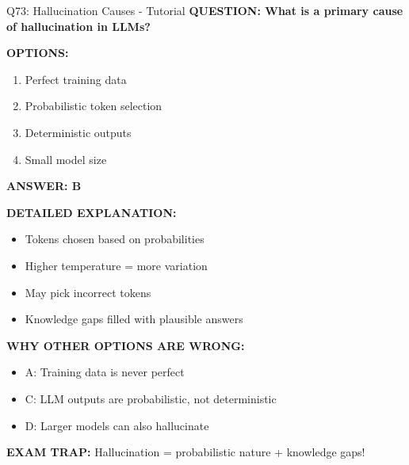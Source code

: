 \documentclass[8pt]{beamer}
\begin{document}
	\begin{frame}{Q73: Hallucination Causes - Tutorial}
		\fontsize{6.5}{7.5}\selectfont
		\textbf{QUESTION: What is a primary cause of hallucination in LLMs?}
		
		\vspace{0.1cm}
		\textbf{OPTIONS:}
		\begin{enumerate}
			\item Perfect training data
			\item Probabilistic token selection
			\item Deterministic outputs
			\item Small model size
		\end{enumerate}
		
		\vspace{0.1cm}
		\textcolor{myblue}{\textbf{ANSWER: B}}
		
		\vspace{0.1cm}
		\textbf{DETAILED EXPLANATION:}
		\begin{itemize}
			\item Tokens chosen based on probabilities
			\item Higher temperature = more variation
			\item May pick incorrect tokens
			\item Knowledge gaps filled with plausible answers
		\end{itemize}
		
		\vspace{0.1cm}
		\textcolor{myred}{\textbf{WHY OTHER OPTIONS ARE WRONG:}}
		\begin{itemize}
			\item \textcolor{myred}{A:} Training data is never perfect
			\item \textcolor{myred}{C:} LLM outputs are probabilistic, not deterministic
			\item \textcolor{myred}{D:} Larger models can also hallucinate
		\end{itemize}
		
		\textcolor{myred}{\textbf{EXAM TRAP:}} Hallucination = \textcolor{myblue}{probabilistic nature} + knowledge gaps!
	\end{frame}
	
\end{document}
